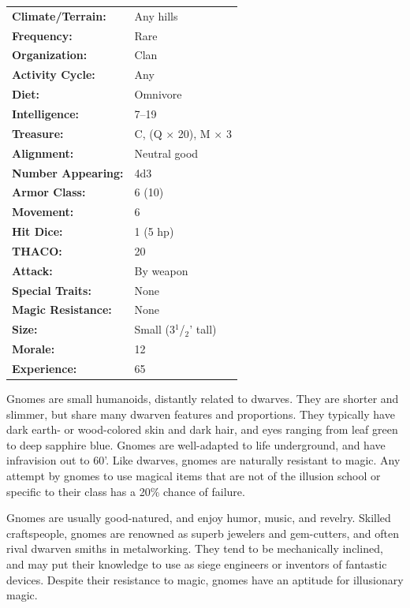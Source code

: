 \begin{multicols}{2}
\begin{minipage}{\columnwidth}
\noindent \begin{tabular}{p{}p{}}
\textbf{Climate/Terrain:}	& Any hills \\
\textbf{Frequency:} 		& Rare \\
\textbf{Organization:} 		& Clan \\
\textbf{Activity Cycle:} 	& Any \\
\textbf{Diet:} 				& Omnivore \\
\textbf{Intelligence:} 		& 7--19 \\
\textbf{Treasure:} 			& C, (Q $\times$ 20), M $\times$ 3 \\
\textbf{Alignment:} 		& Neutral good \\
\hline
\textbf{Number Appearing:} 	& 4d3 \\
\textbf{Armor Class:} 		& 6 (10)	\\
\textbf{Movement:} 			& 6 \\
\textbf{Hit Dice:} 			& 1 (5 hp) \\
\textbf{THACO:} 			& 20 \\
\textbf{Attack:} 			& By weapon \\
\textbf{Special Traits:} & None \\
\textbf{Magic Resistance:} 	& None \\
\textbf{Size:} 				& Small (3$^1$/$_2$' tall) \\
\textbf{Morale:} 			& 12 \\
\textbf{Experience:} 		& 65 \\
\end{tabular}

\end{minipage}

Gnomes are small humanoids, distantly related to dwarves. They are shorter and slimmer, but share many dwarven features and proportions. They typically have dark earth- or wood-colored skin and dark hair, and eyes ranging from leaf green to deep sapphire blue. Gnomes are well-adapted to life underground, and have infravision out to 60'. Like dwarves, gnomes are naturally resistant to magic. Any attempt by gnomes to use magical items that are not of the illusion school or specific to their class has a 20\% chance of failure.

Gnomes are usually good-natured, and enjoy humor, music, and revelry. Skilled craftspeople, gnomes are renowned as superb jewelers and gem-cutters, and often rival dwarven smiths in metalworking. They tend to be mechanically inclined, and may put their knowledge to use as siege engineers or inventors of fantastic devices. Despite their resistance to magic, gnomes have an aptitude for illusionary magic.


\end{multicols}

